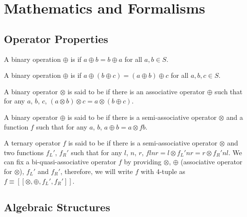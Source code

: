 \chapter{Mathematics and Formalisms}

\section{Operator Properties}

\begin{defi}
A binary operation $\oplus$ is  if $a\oplus b = b\oplus a$ for all $a,b\in S$.\cite{Oppliger:2011:CC:2049860}
\end{defi}

\begin{defi}
A binary operation $\oplus$ is  if $a\oplus\left(b\oplus c\right) = \left(a\oplus b\right)\oplus c$ for all $a,b,c\in S$.\cite{Oppliger:2011:CC:2049860}
\end{defi}

\begin{defi}
A binary operator $\otimes$ is said to be  if there is an associative operator $\oplus$ such that for any $a$, $b$, $c$, $\left(a\otimes b\right)\otimes c = a\otimes\left(b\oplus c\right)$.\cite{conf/europar/MatsuzakiHT03}
\end{defi}

\begin{defi}
A binary operator $\oplus$ is said to be  if there is a semi-associative operator $\otimes$ and a function $f$ such that for any $a$, $b$, $a\oplus b = a\otimes f b$.\cite{conf/europar/MatsuzakiHT03}
\end{defi}

\begin{defi}
A ternary operator $f$ is said to be  if there is a semi-associative operator $\otimes$ and two functions $f_L'$, $f_R'$ such that for any $l$, $n$, $r$, $f l n r = l \otimes f_L' n r = r \otimes f_R' n l$. We can fix a bi-quasi-associative operator $f$ by providing $\otimes$, $\oplus$ (associative operator for $\otimes$), $f_L'$ and $f_R'$, therefore, we will write $f$ with 4-tuple as $f\equiv \left[\left[\otimes,\oplus, f_L', f_R' \right]\right]$.\cite{conf/europar/MatsuzakiHT03}
\end{defi}

\section{Algebraic Structures}

